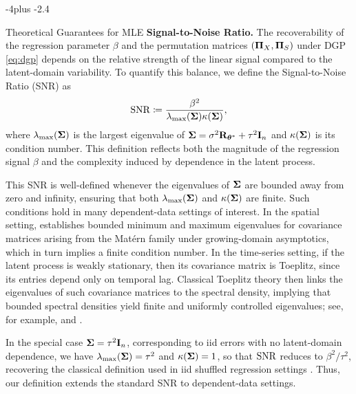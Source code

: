 \documentclass[numsec,webpdf,modern,medium,namedate]{oup-authoring-template}
\makeatletter
\theoremstyle{thmstyleone}%
\theoremstyle{thmstyletwo}%
\theoremstyle{thmstylethree}%
\def\section{%
  \@startsection{section}{1}{\z@}
  {-4\p@ plus -2\p@}{\if@traditional\if@large.4\p@\else\if@medium6.5\p@\else4\p@\fi\fi\else\if@contemporary5\p@\else4\p@\fi\fi}
  {\reset@font\raggedright\secsize}}
\makeatother
\begin{document}
\section{Theoretical Guarantees for MLE}\label{sec:theory}
\textbf{Signal-to-Noise Ratio.} The recoverability of the regression parameter $\beta$ and the permutation matrices $(\boldsymbol{\Pi}_X,\boldsymbol{\Pi}_S)$ under DGP \eqref{eq:dgp} depends on the relative strength of the linear signal compared to the latent-domain variability. To quantify this balance, we define the Signal-to-Noise Ratio (SNR) as
\begin{eqnarray*}
\mathrm{SNR} \coloneq \dfrac{\beta^2}{\lambda_{\max}(\boldsymbol{\Sigma})\kappa(\boldsymbol{\Sigma})},
\end{eqnarray*}
where $\lambda_{\max}(\boldsymbol{\Sigma})$ is the largest eigenvalue of $\boldsymbol{\Sigma} = \sigma^2\mathbf{R}_{\boldsymbol{\theta}^\ast} +\tau^2\mathbf{I}_n$ and $\kappa(\boldsymbol{\Sigma})$ is its condition number. This definition reflects both the magnitude of the regression signal $\beta$ and the complexity induced by dependence in the latent process.

This SNR is well-defined whenever the eigenvalues of $\boldsymbol{\Sigma}$ are bounded away from zero and infinity, ensuring that both $\lambda_{\max}(\boldsymbol{\Sigma})$ and $\kappa(\boldsymbol{\Sigma})$ are finite. Such conditions hold in many dependent-data settings of interest. In the spatial setting, \citet{zhan2024neural} establishes bounded minimum and maximum eigenvalues for covariance matrices arising from the Mat\'ern family under growing-domain asymptotics, which in turn implies a finite condition number. In the time-series setting, if the latent process is weakly stationary, then its covariance matrix is Toeplitz, since its entries depend only on temporal lag. Classical Toeplitz theory then links the eigenvalues of such covariance matrices to the spectral density, implying that bounded spectral densities yield finite and uniformly controlled eigenvalues; see, for example, \citet{gray2006toeplitz} and \citet{xiao2012covariance}.

In the special case $\boldsymbol{\Sigma} = \tau^2 \mathbf{I}_n$, corresponding to iid errors with no latent-domain dependence, we have $\lambda_{\max}(\boldsymbol{\Sigma})=\tau^2$ and $\kappa(\boldsymbol{\Sigma})=1$, so that $\mathrm{SNR}$ reduces to $\beta^2/\tau^2$, recovering the classical definition used in iid shuffled regression settings \citep{pananjady2017linear,slawski2019}. Thus, our definition extends the standard SNR to dependent-data settings.
\end{document}
